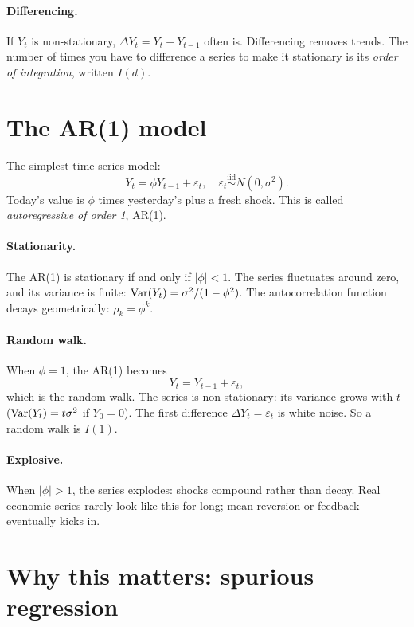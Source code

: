 \paragraph{Differencing.} If $Y_t$ is non-stationary, $\Delta Y_t = Y_t - Y_{t-1}$ often is. Differencing removes trends. The number of times you have to difference a series to make it stationary is its \emph{order of integration}, written $I(d)$.

\section{The AR(1) model}

The simplest time-series model:
\begin{equation}
  Y_t = \phi Y_{t-1} + \varepsilon_t, \quad \varepsilon_t \overset{\text{iid}}{\sim} N(0, \sigma^2).
  \label{eq:ar1}
\end{equation}
Today's value is $\phi$ times yesterday's plus a fresh shock. This is called \emph{autoregressive of order 1}, AR(1).

\paragraph{Stationarity.} The AR(1) is stationary if and only if $|\phi| < 1$. The series fluctuates around zero, and its variance is finite: $\operatorname{Var}(Y_t) = \sigma^2/(1 - \phi^2)$. The autocorrelation function decays geometrically: $\rho_k = \phi^k$.

\paragraph{Random walk.} When $\phi = 1$, the AR(1) becomes
\[
  Y_t = Y_{t-1} + \varepsilon_t,
\]
which is the random walk. The series is non-stationary: its variance grows with $t$ ($\operatorname{Var}(Y_t) = t \sigma^2$ if $Y_0 = 0$). The first difference $\Delta Y_t = \varepsilon_t$ is white noise. So a random walk is $I(1)$.

\paragraph{Explosive.} When $|\phi| > 1$, the series explodes: shocks compound rather than decay. Real economic series rarely look like this for long; mean reversion or feedback eventually kicks in.

\section{Why this matters: spurious regression}

